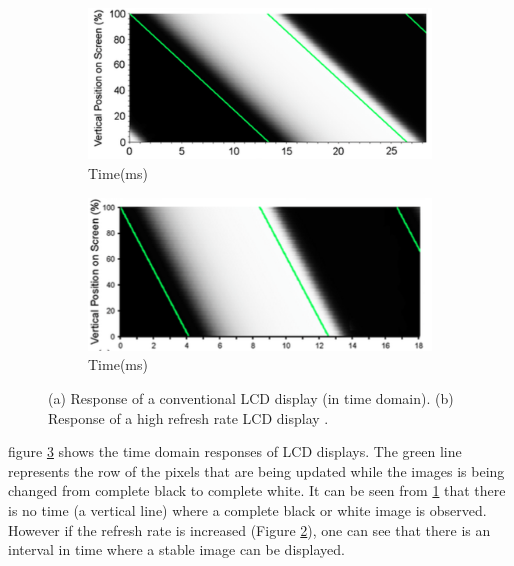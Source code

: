 \begin{figure}[htbp]
\centering
     \begin{subfigure}[b]{0.4\textwidth}
        \includegraphics[width=\textwidth]{./Template_Figures/LCD_refresh_low}
        \caption{ Time(ms)}\label{fig:response_low}
    \end{subfigure}
    \begin{subfigure}[b]{0.4\textwidth}
        \includegraphics[width=\textwidth]{./Template_Figures/LCD_refresh_high}
        \caption{ Time(ms)}\label{fig:response_high}
    \end{subfigure}

    \caption{(a) Response of a conventional LCD display (in time domain). (b) Response of a high refresh rate LCD display \cite{woods2012crosstalk}.  \label{fig:LCD_refresh}}
\end{figure}

figure \ref{fig:LCD_refresh} shows the time domain responses of LCD displays. The green line represents the row of the pixels that are being updated while the images is being changed from complete black to complete white. It can be seen from \ref{fig:response_low} that there is no time (a vertical line) where a complete black or white image is observed. However if the refresh rate is increased (Figure \ref{fig:response_high}), one can see that there is an interval in time where a stable image can be displayed.

